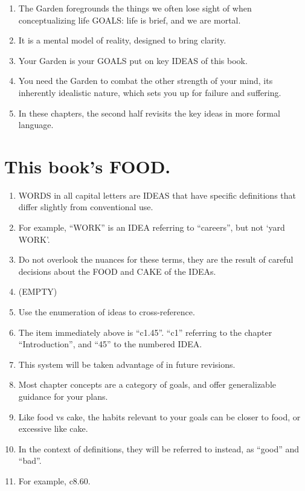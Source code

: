 \documentclass[
]{book}
\providecommand{\tightlist}{%
  \setlength{\itemsep}{0pt}\setlength{\parskip}{0pt}}
\begin{document}
\begin{enumerate}
\def\labelenumi{\arabic{enumi}.}
\setcounter{enumi}{35}
\tightlist
\item
  The Garden foregrounds the things we often lose sight of when conceptualizing
  life GOALS: life is brief, and we are mortal.
\item
  It is a mental model of reality, designed to bring clarity.
\item
  Your Garden is your GOALS put on key IDEAS of this book.
\item
  You need the Garden to combat the other strength of your mind, its inherently
  idealistic nature, which sets you up for failure and suffering.
\item
  In these chapters, the second half revisits the key ideas in more formal
  language.
\end{enumerate}

\hypertarget{this-books-food.}{%
\section{This book's FOOD.}\label{this-books-food.}}

\begin{enumerate}
\def\labelenumi{\arabic{enumi}.}
\setcounter{enumi}{40}
\tightlist
\item
  WORDS in all capital letters are IDEAS that have specific definitions that differ
  slightly from conventional use.
\item
  For example, ``WORK'' is an IDEA referring to ``careers'', but not `yard WORK'.
\item
  Do not overlook the nuances for these terms, they are the result of careful decisions about the FOOD and CAKE of the IDEAs.
\item
  (EMPTY)
\item
  Use the enumeration of ideas to cross-reference.
\item
  The item immediately above is ``c1.45''. ``c1'' referring to the chapter ``Introduction'', and ``45'' to the numbered IDEA.
\item
  This system will be taken advantage of in future revisions.
\item
  Most chapter concepts are a category of goals, and offer generalizable guidance for your plans.
\item
  Like food vs cake, the habits relevant to your goals can be closer to food, or excessive like cake.
\item
  In the context of definitions, they will be referred to instead, as ``good'' and ``bad''.
\item
  For example, c8.60.
\end{enumerate}
\end{document}
